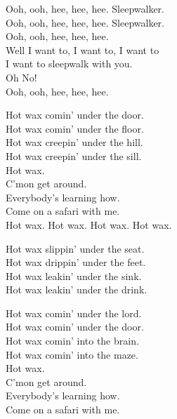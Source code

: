 Ooh, ooh, hee, hee, hee. Sleepwalker. \\
Ooh, ooh, hee, hee, hee. Sleepwalker. \\
Ooh, ooh, hee, hee, hee. \\
Well I want to, I want to, I want to \\
I want to sleepwalk with you. \\
Oh No! \\
Ooh, ooh, hee, hee, hee. \\





Hot wax comin' under the door. \\
Hot wax comin' under the floor. \\
Hot wax creepin' under the hill. \\
Hot wax creepin' under the sill. \\

Hot wax. \\
C'mon get around. \\
Everybody's learning how. \\
Come on a safari with me. \\

Hot wax. Hot wax. Hot wax. Hot wax. \\


Hot wax slippin' under the seat. \\
Hot wax drippin' under the feet. \\
Hot wax leakin' under the sink. \\
Hot wax leakin' under the drink. \\


Hot wax comin' under the lord. \\
Hot wax comin' under the door. \\
Hot wax comin' into the brain. \\
Hot wax comin' into the maze. \\

Hot wax. \\
C'mon get around. \\
Everybody's learning how. \\
Come on a safari with me. \\

